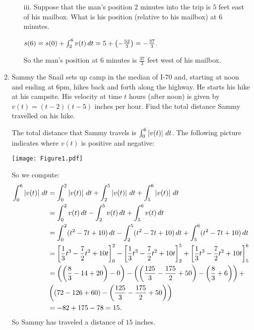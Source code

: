 \documentclass[nooutcomes]{ximera}
\begin{document}
\begin{problem}
\begin{enumerate}
\begin{enumerate}
		\item[iii.]  Suppose that the man's position $2$ minutes into the trip is $5$ feet east of his mailbox.  What is his position (relative to his mailbox) at $6$ minutes.
			\begin{freeResponse}
			$s(6) = s(0) + \int_2^6 v(t) \,d t = 5 + \left(- \frac{52}{3} \right) = - \frac{37}{3}. $
			
			So the man's position at $6$ minutes is $\frac{37}{3}$ feet west of his mailbox.
			\end{freeResponse}
				
		\end{enumerate}
		
		
		
	\item  Sammy the Snail sets up camp in the median of I-70 and, starting at noon and ending at 6pm, hikes back and forth along the highway.  He starts his hike at his campsite.  His velocity at time $t$ hours (after noon)  is given by $v(t)=(t-2)(t-5)$ inches per hour.  Find the total distance Sammy travelled on his hike.  
		\begin{freeResponse}
		The total distance that Sammy travels is $\int_0^6 \left| v(t) \right| \,d t$.  
		The following picture indicates where $v(t)$ is positive and negative:
			\begin{image}
			\texttt{[image: Figure1.pdf]}
			\end{image}
		So we compute:
			\begin{align*}
			\int_0^6 \left| v(t) \right| \,d t &= \int_0^2 \left| v(t) \right| \,d t + \int_2^5 \left| v(t) \right| \,d t + \int_5^6 \left| v(t) \right| \,d t  \\
			&= \int_0^2 v(t) \,d t - \int_2^5 v(t) \,d t + \int_5^6 v(t) \,d t  \\
			&= \int_0^2 (t^2 - 7t + 10) \,d t - \int_2^5 (t^2 - 7t + 10) \,d t + \int_5^6 (t^2 - 7t + 10) \,d t  \\
			&= \bigg[ \frac{1}{3}t^3-\frac{7}{2}t^2+10t \bigg]_0^2-\bigg[ \frac{1}{3}t^3-\frac{7}{2}t^2+10t \bigg]_2^5+\bigg[ \frac{1}{3}t^3-\frac{7}{2}t^2+10t \bigg]_5^6  \\
			&= \left( \left(\frac{8}{3}-14+20 \right)-0\right)-\left( \left( \frac{125}{3}-\frac{175}{2}+50 \right)-\left( \frac{8}{3}+6 \right) \right)+  \\
			&\left( \left( 72-126+60 \right) - \left( \frac{125}{3} - \frac{175}{2} + 50 \right) \right)  \\
			&= -82+175-78=15.
			\end{align*}
		So Sammy has traveled a distance of $15$ inches.
		\end{freeResponse}
		
		
		
	\end{enumerate}
		
		
\end{problem}
\end{document}
